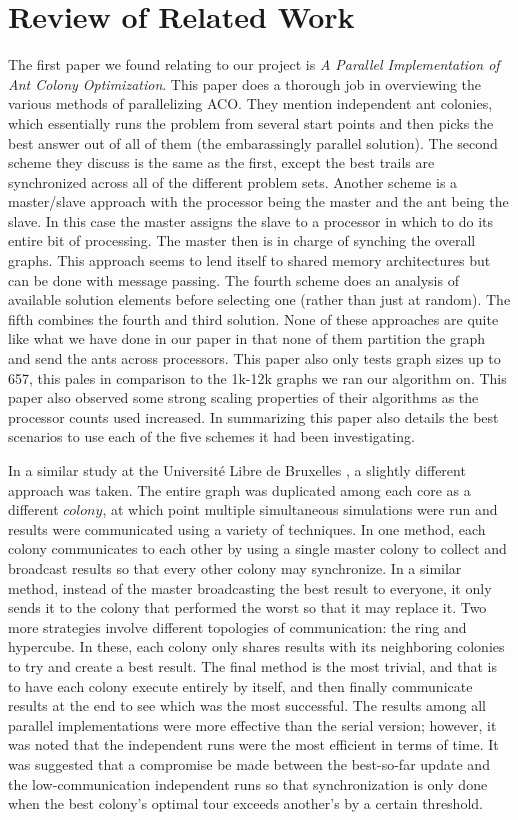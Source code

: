 \documentclass{acm_proc_article-sp}
\begin{document}
\section{Review of Related Work}
The first paper we found relating to our project is \textit{A Parallel Implementation of Ant Colony Optimization}\cite{Randall20021421}. This paper does a thorough job in overviewing 
the various methods of parallelizing ACO. They mention independent ant colonies, which essentially runs the problem from several start points and then picks the best answer out of all of them 
(the embarassingly parallel solution). The second scheme they discuss is the same as the first, except the best trails are synchronized across all of the different problem sets. Another scheme is
a master/slave approach with the processor being the master and the ant being the slave. In this case the master assigns the slave to a processor in which to do its entire bit of processing. The master then
is in charge of synching the overall graphs. This approach seems to lend itself to shared memory architectures but can be done with message passing. The fourth scheme does an analysis of available solution elements
before selecting one (rather than just at random). The fifth combines the fourth and third solution. None of these approaches are quite like what we have done in our paper in that none of them partition the graph
and send the ants across processors. This paper also only tests graph sizes up to 657, this pales in comparison to the 1k-12k graphs we ran our algorithm on. This paper also observed some strong scaling properties
of their algorithms as the processor counts used increased. In summarizing this paper also details the best scenarios to use each of the five schemes it had been investigating. 

In a similar study at the Universit\'{e} Libre de Bruxelles \citep{Bruxelles2006}, a
slightly different approach was taken. The entire graph was duplicated among
each core as a different $colony$, at which point multiple simultaneous
simulations were run and results were communicated using a variety of
techniques. In one method, each colony communicates to each other by using a
single master colony to collect and broadcast results so that every other colony
may synchronize. In a similar method, instead of the master broadcasting the
best result to everyone, it only sends it to the colony that performed the worst
so that it may replace it. Two more strategies involve different topologies of
communication: the ring and hypercube. In these, each colony only shares results
with its neighboring colonies to try and create a best result. The final method
is the most trivial, and that is to have each colony execute entirely by itself,
and then finally communicate results at the end to see which was the most
successful. The results among all parallel implementations were more effective
than the serial version; however, it was noted that the independent runs were
the most efficient in terms of time. It was suggested that a compromise be made
between the best-so-far update and the low-communication independent runs so
that synchronization is only done when the best colony's optimal tour exceeds
another's by a certain threshold.
\end{document}
